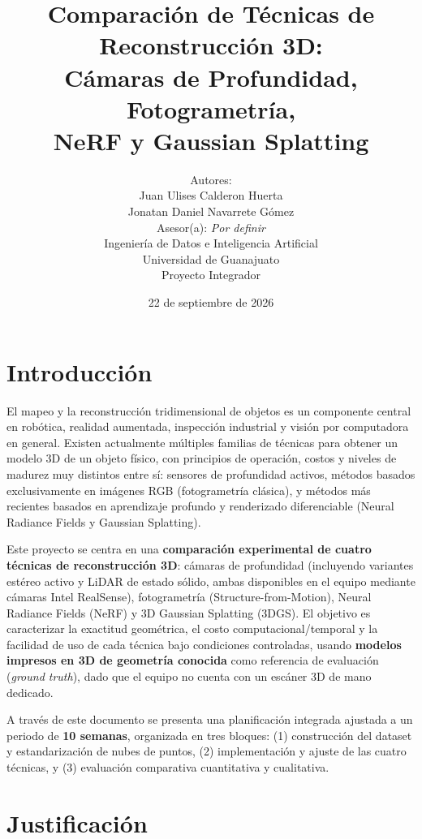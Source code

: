 \documentclass[11pt]{article}
\title{\textbf{Comparaci\'on de T\'ecnicas de Reconstrucci\'on 3D: \\ C\'amaras de Profundidad, Fotogrametr\'ia, \\ NeRF y Gaussian Splatting}}
\author{
Autores: \\
Juan Ulises Calderon Huerta \\
Jonatan Daniel Navarrete G\'omez \\[0.5em]
Asesor(a): \emph{Por definir} \\[0.5em]
Ingenier\'ia de Datos e Inteligencia Artificial \\
Universidad de Guanajuato \\
Proyecto Integrador
}
\date{22 de septiembre de 2026}
\begin{document}
\maketitle



\vspace{1em}

\section{Introducci\'on}

El mapeo y la reconstrucci\'on tridimensional de objetos es un componente central en rob\'otica, realidad aumentada, inspecci\'on industrial y visi\'on por computadora en general. Existen actualmente m\'ultiples familias de t\'ecnicas para obtener un modelo 3D de un objeto f\'isico, con principios de operaci\'on, costos y niveles de madurez muy distintos entre s\'i: sensores de profundidad activos, m\'etodos basados exclusivamente en im\'agenes RGB (fotogrametr\'ia cl\'asica), y m\'etodos m\'as recientes basados en aprendizaje profundo y renderizado diferenciable (Neural Radiance Fields y Gaussian Splatting).

Este proyecto se centra en una \textbf{comparaci\'on experimental de cuatro t\'ecnicas de reconstrucci\'on 3D}: c\'amaras de profundidad (incluyendo variantes est\'ereo activo y LiDAR de estado s\'olido, ambas disponibles en el equipo mediante c\'amaras Intel RealSense), fotogrametr\'ia (Structure-from-Motion), Neural Radiance Fields (NeRF) y 3D Gaussian Splatting (3DGS). El objetivo es caracterizar la exactitud geom\'etrica, el costo computacional/temporal y la facilidad de uso de cada t\'ecnica bajo condiciones controladas, usando \textbf{modelos impresos en 3D de geometr\'ia conocida} como referencia de evaluaci\'on (\emph{ground truth}), dado que el equipo no cuenta con un esc\'aner 3D de mano dedicado.

A trav\'es de este documento se presenta una planificaci\'on integrada ajustada a un periodo de \textbf{10 semanas}, organizada en tres bloques: (1) construcci\'on del dataset y estandarizaci\'on de nubes de puntos, (2) implementaci\'on y ajuste de las cuatro t\'ecnicas, y (3) evaluaci\'on comparativa cuantitativa y cualitativa.

\section{Justificaci\'on}
\end{document}
